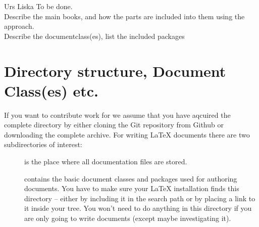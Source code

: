 \documentclass[openlilylib-cg]{subfiles}
\begin{document}

\begin{authorAbstract}{Urs Liska}
To be done.\\
Describe the main books, and how the parts are included into them using the  approach.\\
Describe the documentclass(es), list the included packages
\end{authorAbstract}

\chapter{Directory structure, Document Class(es) etc.}

If you want to contribute work for \openlilylib{} we assume that you have aqcuired the complete directory by either cloning the Git repository from Github or downloading the complete archive.
For writing \LaTeX{} documents there are two subdirectories of interest: 
\begin{description}
\item[] is the place where all documentation files are stored.
\item[] contains the basic document classes and packages used for authoring documents.
You have to make sure your \LaTeX{} installation finds this directory -- either by including it in the search path or by placing a link to it inside your  tree.
You won't need to do anything in this directory if you are only going to write documents (except maybe investigating it).
\end{description}
\end{document}
